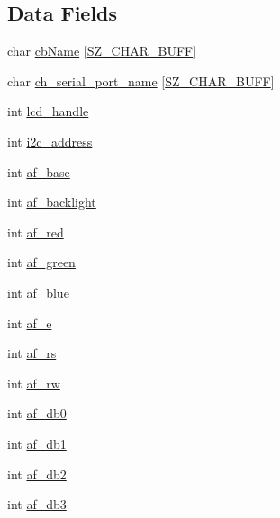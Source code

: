 \subsection*{Data Fields}
\begin{DoxyCompactItemize}
\item 
char \hyperlink{struct___i_i_c_l_c_d_a3f9347595482a6da5cb5d536d937a554}{cb\+Name} \mbox{[}\hyperlink{skn__common__headers_8h_a8d2978ad614b0de81c60483e706d9306}{S\+Z\+\_\+\+C\+H\+A\+R\+\_\+\+B\+U\+FF}\mbox{]}
\item 
char \hyperlink{struct___i_i_c_l_c_d_a2f193b0806fdbba1d644567835e2b2e8}{ch\+\_\+serial\+\_\+port\+\_\+name} \mbox{[}\hyperlink{skn__common__headers_8h_a8d2978ad614b0de81c60483e706d9306}{S\+Z\+\_\+\+C\+H\+A\+R\+\_\+\+B\+U\+FF}\mbox{]}
\item 
int \hyperlink{struct___i_i_c_l_c_d_afc74b2d9120be4a8e69e48b220d6781c}{lcd\+\_\+handle}
\item 
int \hyperlink{struct___i_i_c_l_c_d_a3f3fe8757875939b987ac0c416081551}{i2c\+\_\+address}
\item 
int \hyperlink{struct___i_i_c_l_c_d_ae74954b1b96523d617a68e42c2663086}{af\+\_\+base}
\item 
int \hyperlink{struct___i_i_c_l_c_d_ad160086a31276fbaf849855519b9878e}{af\+\_\+backlight}
\item 
int \hyperlink{struct___i_i_c_l_c_d_aca8ab39cfa9f683b2d03269886a0f633}{af\+\_\+red}
\item 
int \hyperlink{struct___i_i_c_l_c_d_a70176d63c9065d4186f55ae8328a82d3}{af\+\_\+green}
\item 
int \hyperlink{struct___i_i_c_l_c_d_ad64bc4c5fc6a592f161e594f0b2433e1}{af\+\_\+blue}
\item 
int \hyperlink{struct___i_i_c_l_c_d_a896f8305b5c0395ea7f9074904047b32}{af\+\_\+e}
\item 
int \hyperlink{struct___i_i_c_l_c_d_af738bf1e020daaa5476b917c375e807a}{af\+\_\+rs}
\item 
int \hyperlink{struct___i_i_c_l_c_d_ad0162f6a3e82c34192c0d901ef0ff6be}{af\+\_\+rw}
\item 
int \hyperlink{struct___i_i_c_l_c_d_a86dfd51ffdc849569bc91bba9f9cd4a6}{af\+\_\+db0}
\item 
int \hyperlink{struct___i_i_c_l_c_d_a114a5f81c889fe857d714a3a5033b397}{af\+\_\+db1}
\item 
int \hyperlink{struct___i_i_c_l_c_d_a7b88e6903c8fb93882c396261ffe40b5}{af\+\_\+db2}
\item 
int \hyperlink{struct___i_i_c_l_c_d_a26f362cb78eb2227a14706e9c992a066}{af\+\_\+db3}

\end{DoxyCompactItemize}
